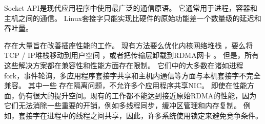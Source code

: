 
Socket API是现代应用程序中使用最广泛的通信原语。 它通常用于进程，容器和主机之间的通信。
Linux套接字只能实现比硬件的原始功能差一个数量级的延迟和吞吐量。

存在大量旨在改善插座性能的工作。
现有方法要么优化内核网络堆栈 \cite {lin2016scalable,han2012megapipe,yasukata2016stackmap}，要么将TCP / IP堆栈移动到用户空间 \cite {jeong2014mtcp,marinos2014network,seastar,fstack,libvma}，或者把传输层卸载到RDMA网卡 \cite{rsockets,socketsdirect}。
但是，所有这些解决方案都在兼容性和性能方面存在限制。
它们中的大多数在诸如进程 fork，事件轮询，多应用程序套接字共享和主机内通信等方面与本机套接字不完全兼容。
其中一些 \cite {jeong2014mtcp}存在隔离问题，不允许多个应用程序共享NIC。
即使在性能方面，仍有很大的提升空间。现有的工作都不能达到接近原始RDMA的性能，因为它们无法消除一些重要的开销，例如多线程同步，缓冲区管理和内存复制。
例如，套接字在进程中的线程之间共享，因此，许多系统使用锁定来避免竞争条件。

